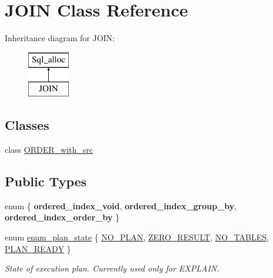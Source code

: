 \hypertarget{classJOIN}{}\section{J\+O\+IN Class Reference}
\label{classJOIN}
Inheritance diagram for J\+O\+IN\+:\begin{figure}[H]
\begin{center}
\leavevmode
\includegraphics[height=2.000000cm]{classJOIN}
\end{center}
\end{figure}
\subsection*{Classes}
\begin{DoxyCompactItemize}
\item 
class \mbox{\hyperlink{classJOIN_1_1ORDER__with__src}{O\+R\+D\+E\+R\+\_\+with\+\_\+src}}
\end{DoxyCompactItemize}
\subsection*{Public Types}
\begin{DoxyCompactItemize}
\item 
\mbox{\label{classJOIN_a4077cfaa78289ac3eee99ef18050f87d}} 
enum \{ {\bfseries ordered\+\_\+index\+\_\+void}, 
{\bfseries ordered\+\_\+index\+\_\+group\+\_\+by}, 
{\bfseries ordered\+\_\+index\+\_\+order\+\_\+by}
 \}
\item 
enum \mbox{\hyperlink{classJOIN_a965b8cb3ded4b0e826a3cab5f7d88694}{enum\+\_\+plan\+\_\+state}} \{ \mbox{\hyperlink{classJOIN_a965b8cb3ded4b0e826a3cab5f7d88694a4022679ac4b71899e09ae694d12f63e8}{N\+O\+\_\+\+P\+L\+AN}}, 
\mbox{\hyperlink{classJOIN_a965b8cb3ded4b0e826a3cab5f7d88694ab70074c02eaeac14f21d9fe7fd4d9890}{Z\+E\+R\+O\+\_\+\+R\+E\+S\+U\+LT}}, 
\mbox{\hyperlink{classJOIN_a965b8cb3ded4b0e826a3cab5f7d88694a3056ab60db67d76fbb710cd6d7113cf6}{N\+O\+\_\+\+T\+A\+B\+L\+ES}}, 
\mbox{\hyperlink{classJOIN_a965b8cb3ded4b0e826a3cab5f7d88694af3eb17fcff8c8d8425b6e449079aa981}{P\+L\+A\+N\+\_\+\+R\+E\+A\+DY}}
 \}
\begin{DoxyCompactList}\small\item\em State of execution plan. Currently used only for E\+X\+P\+L\+A\+IN. \end{DoxyCompactList}\end{DoxyCompactItemize}
